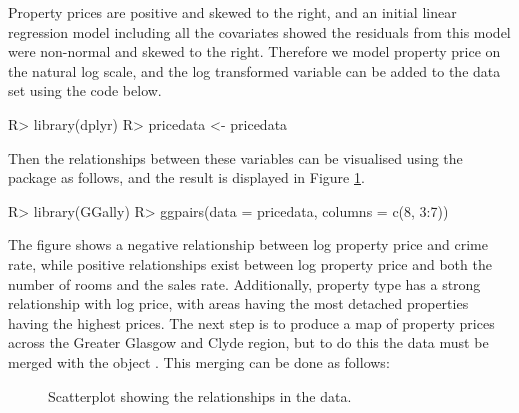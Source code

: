 \documentclass[article,shortnames,nojss]{jss}
\begin{document}
\hspace{1cm}Property prices are positive and skewed to the right, and an initial linear regression model including all the covariates showed the residuals from this model were non-normal and skewed to the right. Therefore we model property price on the natural log scale, and the log transformed variable can be added to the data set using the code below.

\begin{Schunk}
\begin{Sinput}
R> library(dplyr)
R> pricedata <- pricedata %
\end{Sinput}
\end{Schunk}

Then the relationships between these variables can be visualised using the  package as follows, and the result is displayed in Figure \ref{scatterplot}.


\begin{Schunk}
\begin{Sinput}
R> library(GGally)
R> ggpairs(data = pricedata, columns = c(8, 3:7))
\end{Sinput}
\end{Schunk}

The figure shows a negative relationship between log property price and crime rate, while positive relationships exist between log property price and both the number of rooms and the sales rate. Additionally, property type has a strong relationship with log price, with areas having the most detached properties having the highest prices. The next step is to produce a map of property prices across the Greater Glasgow and Clyde region, but to do this the data must be merged with the  object . This merging can be done as follows:


\begin{figure}
\centering 
{}
\caption{Scatterplot showing the relationships in the data.\label{scatterplot}}
\end{figure} 
\end{document}
